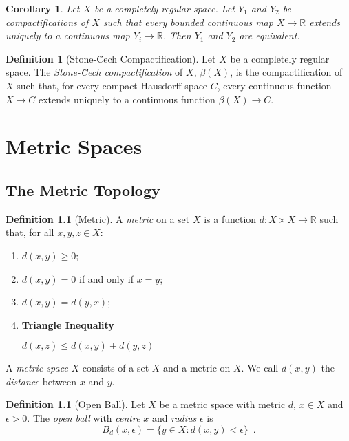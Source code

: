 \documentclass{report}
\newtheorem{cor}{Corollary}[lm]
\theoremstyle{definition}
\newtheorem{df}[lm]{Definition}
\begin{document}
\begin{cor}
  Let $X$ be a completely regular space. Let $Y_1$ and $Y_2$ be compactifications of $X$ such that every bounded continuous map $X \rightarrow \mathbb{R}$
  extends uniquely to a continuous map $Y_i \rightarrow \mathbb{R}$. Then $Y_1$ and $Y_2$ are equivalent.
\end{cor}

\begin{df}[Stone-\u{C}ech Compactification]
  Let $X$ be a completely regular space. The \emph{Stone-\u{C}ech compactification} of $X$, $\beta(X)$, is the compactification of $X$ such that, for every compact Hausdorff space $C$,
  every continuous function $X \rightarrow C$ extends uniquely to a continuous function $\beta(X) \rightarrow C$.
\end{df}

  \chapter{Metric Spaces}

  \section{The Metric Topology}

  \begin{df}[Metric]
    A \emph{metric} on a set $X$ is a function $d : X \times X \rightarrow
    \mathbb{R}$ such that, for all $x, y, z \in X$:
    \begin{enumerate}
      \item $d(x, y) \geq 0$;
      \item $d(x, y) = 0$ if and only if $x = y$;
      \item $d(x, y) = d(y, x)$;
      \item \textbf{Triangle Inequality}

      $d(x, z) \leq d(x, y) + d(y, z)$
    \end{enumerate}
    A \emph{metric space} $X$ consists of a set $X$ and a metric on $X$. We
    call $d(x, y)$ the \emph{distance} between $x$ and $y$.
  \end{df}

  \begin{df}[Open Ball]
    Let $X$ be a metric space with metric $d$, $x \in X$ and $\epsilon > 0$.
    The \emph{open       ball} with \emph{centre} $x$ and \emph{radius}
    $\epsilon$
    is
    \[ B_d(x, \epsilon) = \{ y \in X : d(x, y) < \epsilon \} \enspace . \]
  \end{df}
\end{document}
